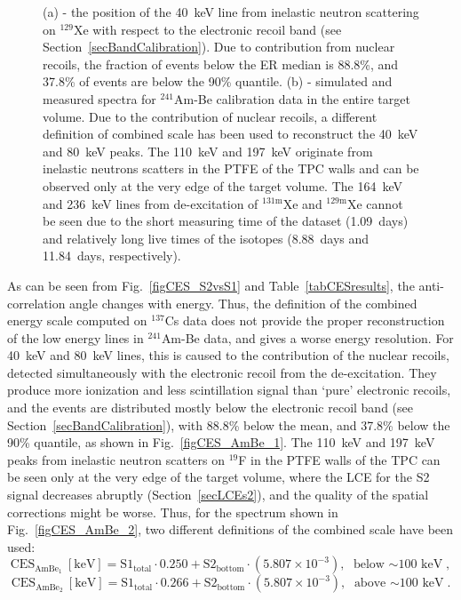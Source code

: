 \begin{figure}[!h]
\caption[The position of the 40~keV line from inelastic neutron scattering on $^{129}$Xe in respect to the electronic recoil band, and the simulated and measured spectra for $^{241}$Am-Be calibration data in the entire target volume]{(a) - the position of the 40~keV line from inelastic neutron scattering on $^{129}$Xe with respect to the electronic recoil band (see Section~\ref{secBandCalibration}). Due to contribution from nuclear recoils, the fraction of events below the ER median is 88.8\%, and 37.8\% of events are below the 90\% quantile. (b) - simulated and measured spectra for $^{241}$Am-Be calibration data in the entire target volume. Due to the contribution of nuclear recoils, a different definition of combined scale has been used to reconstruct the 40~keV and 80~keV peaks. The 110~keV and 197~keV originate from inelastic neutrons scatters in the PTFE of the TPC walls and can be observed only at the very edge of the target volume. The 164~keV and 236~keV lines from de-excitation of $^{131\mathrm{m}}$Xe and $^{129\mathrm{m}}$Xe cannot be seen due to the short measuring time of the dataset (1.09~days) and relatively long live times of the isotopes (8.88~days and 11.84~days, respectively).}
\label{figCES_AmBe}
\end{figure}

As can be seen from Fig.~\ref{figCES_S2vsS1} and Table~\ref{tabCESresults}, the anti-correlation angle changes with energy. Thus, the definition of the combined energy scale computed on $^{137}$Cs data does not provide the proper reconstruction of the low energy lines in $^{241}$Am-Be data, and gives a worse energy  resolution. For 40~keV and 80~keV lines, this is caused to the contribution of the nuclear recoils, detected simultaneously with the electronic recoil from the de-excitation. They produce more ionization and less scintillation signal than `pure' electronic recoils, and the events are distributed mostly below the electronic recoil band (see Section~\ref{secBandCalibration}), with 88.8\% below the mean, and 37.8\% below the 90\% quantile, as shown in Fig.~\ref{figCES_AmBe_1}. The 110~keV and 197~keV peaks from inelastic neutron scatters on $^{19}$F in the PTFE walls of the TPC can be seen only at the very edge of the target volume, where the LCE for the S2 signal decreases abruptly (Section~\ref{secLCEs2}), and the quality of the spatial corrections might be worse. Thus, for the spectrum shown in Fig.~\ref{figCES_AmBe_2}, two different definitions of the combined scale have been used:
\begin{equation}
\label{eqCES_AmBe1}
\mathrm{CES_{AmBe_{1}}\ [keV]} = \mathrm{S1}_{\mathrm{total}} \cdot 0.250 + \mathrm{S2}_{\mathrm{bottom}} \cdot (5.807\times10^{-3}), \text{ below $\sim$100~keV},
\end{equation}
\begin{equation}
\label{eqCES_AmBe2}
\mathrm{CES_{AmBe_{2}}\ [keV]} = \mathrm{S1}_{\mathrm{total}} \cdot 0.266 + \mathrm{S2}_{\mathrm{bottom}} \cdot (5.807\times10^{-3}), \text{ above $\sim$100~keV}.
\end{equation}

